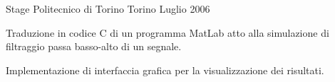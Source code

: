 \begin{cventries}
  \cventry
    {Stage} %
    {Politecnico di Torino} %
    {Torino} %
    {Luglio 2006} %
    {
      \begin{cvitems} %
        \item {Traduzione in codice C di un programma MatLab atto alla simulazione di filtraggio passa basso-alto di un segnale.}
        \item {Implementazione di interfaccia grafica per la visualizzazione dei risultati.}
      \end{cvitems}
    }

\end{cventries}
